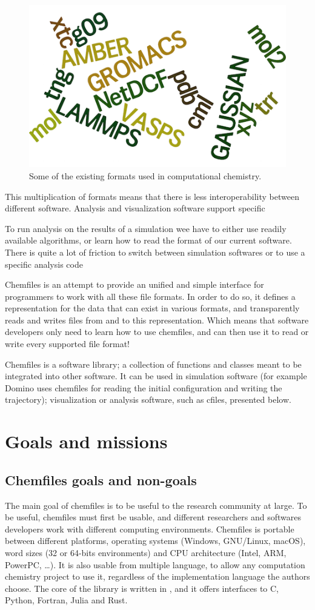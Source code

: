 \documentclass[thesis]{subfiles}
\begin{document}
\begin{figure}[ht]
    \centering
    \includegraphics[width=.4\textwidth]{figures/images/files-formats}
    \caption{Some of the existing formats used in computational chemistry.}
    \label{fig:chemfiles:formats}
\end{figure}

This multiplication of formats means that there is less interoperability between
different software. Analysis and visualization software support specific

To run analysis on the results of a simulation wee have to
either use readily available algorithms, or learn how to read the format of our
current software. There is quite a lot of friction to switch between simulation
softwares or to use a specific analysis code

Chemfiles is an attempt to provide an unified and simple interface for
programmers to work with all these file formats. In order to do so, it defines a
representation for the data that can exist in various formats, and transparently
reads and writes files from and to this representation. Which means that
software developers only need to learn how to use chemfiles, and can then use it
to read or write every supported file format!

Chemfiles is a software library; a collection of functions and classes meant to
be integrated into other software. It can be used in simulation software (for
example Domino uses chemfiles for reading the initial configuration and writing
the trajectory); visualization or analysis software, such as cfiles, presented
below.

\section{Goals and missions}

\subsection{Chemfiles goals and non-goals}

The main goal of chemfiles is to be useful to the research community at large.
To be useful, chemfiles must first be usable, and different researchers and
softwares developers work with different computing environments. Chemfiles is
portable between different platforms, operating systems (Windows, GNU/Linux,
macOS), word sizes (32 or 64-bits environments) and CPU architecture (Intel,
ARM, PowerPC, \dots). It is also usable from multiple language, to allow any
computation chemistry project to use it, regardless of the implementation
language the authors choose. The core of the library is written in \cxx, and it
offers interfaces to C, Python, Fortran, Julia and Rust.
\end{document}
